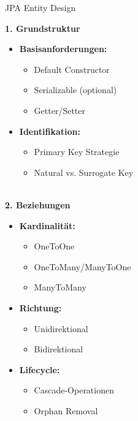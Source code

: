 \begin{KR}{JPA Entity Design}

\textbf{1. Grundstruktur}

\begin{minipage}[t]{0.5\textwidth}
\begin{itemize}
    \item \textbf{Basisanforderungen:}
    \begin{itemize}
        \item Default Constructor
        \item Serializable (optional)
        \item Getter/Setter
    \end{itemize}
    \end{itemize}
\end{minipage}
\begin{minipage}[t]{0.5\textwidth}
\begin{itemize}
    \item \textbf{Identifikation:}
    \begin{itemize}
        \item Primary Key Strategie
        \item Natural vs. Surrogate Key
    \end{itemize}
\end{itemize}
\end{minipage}
\vspace{1mm}\\
\textbf{2. Beziehungen}

\begin{minipage}[t]{0.5\textwidth}
\begin{itemize}
    \item \textbf{Kardinalität:}
    \begin{itemize}
        \item OneToOne
        \item OneToMany/ManyToOne
        \item ManyToMany
    \end{itemize}
\end{itemize}
\end{minipage}
\begin{minipage}[t]{0.5\textwidth}
\begin{itemize}
    \item \textbf{Richtung:}
    \begin{itemize}
        \item Unidirektional
        \item Bidirektional
    \end{itemize}
    \item \textbf{Lifecycle:}
    \begin{itemize}
        \item Cascade-Operationen
        \item Orphan Removal
    \end{itemize}
\end{itemize}
\end{minipage}


\end{KR}
